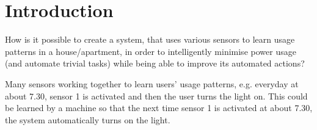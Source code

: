\chapter{Introduction}\label{part:introduction}




\label{problemStatement}

How is it possible to create a system, that uses various sensors to learn usage patterns in a house/apartment, in order to intelligently minimise power usage (and automate trivial tasks) while being able to improve its automated actions?

Many sensors working together to learn users’ usage patterns, e.g. everyday at about 7.30, sensor 1 is activated and then the user turns the light on. This could be learned by a machine so that the next time sensor 1 is activated at about 7.30, the system automatically turns on the light.
